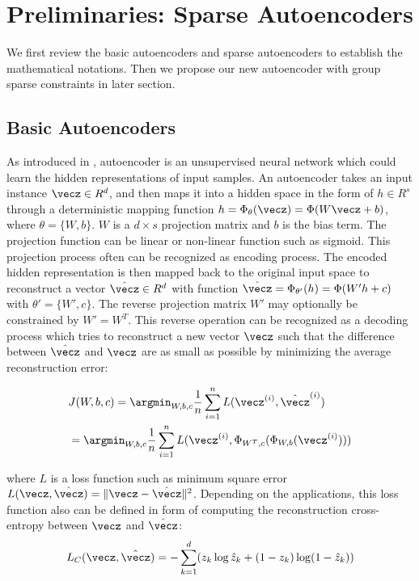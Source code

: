 

\section{Preliminaries: Sparse Autoencoders}
\label{sec:GSA}

We first review the basic autoencoders and sparse autoencoders to establish the mathematical notations. Then we propose our new autoencoder with group sparse constraints in later section.
\subsection{Basic Autoencoders}
As introduced in \cite{NIPS2006_3048}, autoencoder is an unsupervised neural network which could learn the hidden representations of input samples. An autoencoder takes an input instance $\vecz \in R^d$, and then maps it into a hidden space in the form of $h \in R^s$ through a deterministic mapping function $h = \Phi_{\theta}(\vecz) = \Phi(W\vecz + b)$, where $\theta = \{W, b\}$. $W$ is a $d \times s$ projection matrix and $b$ is the bias term. The projection function can be linear or non-linear function such as sigmoid. This projection process often can be recognized as encoding process. The encoded hidden representation is then mapped back to the original input space to reconstruct a vector $\hat{\vecz}\in R^d$ with function $\hat{\vecz}= \Phi_{\theta' } (h) = \Phi(W' h + c)$ with $\theta' = \{W', c\}$. The reverse projection matrix $W'$ may optionally be constrained by $W' = W^T$. This reverse operation can be recognized as a decoding process which tries to reconstruct a new vector $\vecz$ such that the difference between $\hat{\vecz}$ and $\vecz$ are as small as possible by minimizing the average reconstruction error:


\begin{equation}\label{eq:ae_loss}
\begin{split}
& J(W,b,c) = \argmin_{W,b,c} \frac{1}{n} \sum_{i=1}^n L(\vecz^{(i)}, \hat{\vecz}^{(i)})\\
& = \argmin_{W,b,c} \frac{1}{n} \sum_{i=1}^n L(\vecz^{(i)}, \Phi_{W^T,c}(\Phi_{W,b}(\vecz^{(i)})))
\end{split}
\end{equation}

\noindent where $L$ is a loss function such as minimum square error $L(\vecz,\hat{\vecz}) = \| \vecz-\hat{\vecz}\|^2$. Depending on the applications, this loss function also can be defined in form of computing the reconstruction cross-entropy between $\vecz$ and $\hat{\vecz}$:
\begin{equation*}\label{eq:ae_ce}
\begin{split}
L_{C}(\vecz,\hat{\vecz}) = - \sum_{k=1}^d (z_k \log \hat{z}_k + (1-z_k) \log (1-\hat{z}_k))
\end{split}
\end{equation*}

